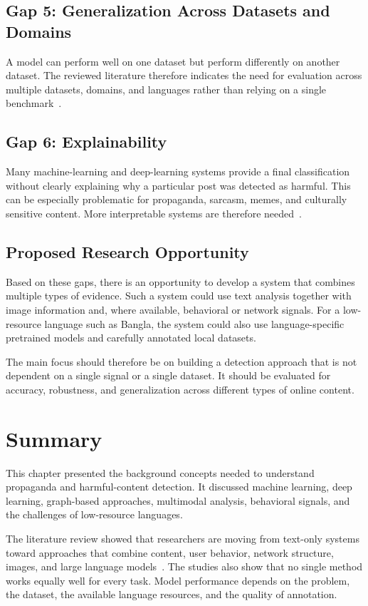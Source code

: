 \documentclass[12pt,a4paper]{report}
\begin{document}
\subsection{Gap 5: Generalization Across Datasets and Domains}
A model can perform well on one dataset but perform differently on another dataset.
The reviewed literature therefore indicates the need for evaluation across multiple
datasets, domains, and languages rather than relying on a single
benchmark~\cite{ahmad2025}.

\subsection{Gap 6: Explainability}
Many machine-learning and deep-learning systems provide a final classification
without clearly explaining why a particular post was detected as harmful. This can
be especially problematic for propaganda, sarcasm, memes, and culturally sensitive
content. More interpretable systems are therefore
needed~\cite{ahmad2025,hee2022,maarouf2024}.

\subsection{Proposed Research Opportunity}
Based on these gaps, there is an opportunity to develop a system that combines
multiple types of evidence. Such a system could use text analysis together with
image information and, where available, behavioral or network signals. For a
low-resource language such as Bangla, the system could also use language-specific
pretrained models and carefully annotated local datasets.

The main focus should therefore be on building a detection approach that is not
dependent on a single signal or a single dataset. It should be evaluated for
accuracy, robustness, and generalization across different types of online content.

\section{Summary}
This chapter presented the background concepts needed to understand propaganda and
harmful-content detection. It discussed machine learning, deep learning,
graph-based approaches, multimodal analysis, behavioral signals, and the challenges
of low-resource languages.

The literature review showed that researchers are moving from text-only systems
toward approaches that combine content, user behavior, network structure, images,
and large language models~\cite{duridi2025,plikynas2025,lora2023,hasan2026,ahmad2025,lin2024,hee2022,declerck2024,sela2025,schneider2026,romim2022,haider2020,wang2022,pina2025,gaeta2025,maarouf2024}.
The studies also show that no single method works equally well for every task.
Model performance depends on the problem, the dataset, the available language
resources, and the quality of annotation.
\end{document}
